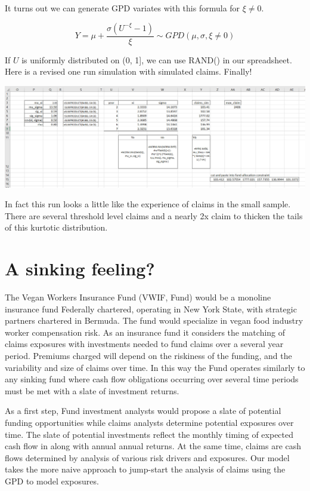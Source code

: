 \documentclass[
]{book}
\begin{document}
It turns out we can generate GPD variates with this formula for \(\xi \neq 0\).

\[
Y =\mu + \frac {\sigma (U^{-\xi }-1)}{\xi } \sim GPD(\mu ,\sigma ,\xi \neq 0)
\]

If \(U\) is uniformly distributed on (0, 1{]}, we can use RAND() in our spreadsheet. Here is a revised one run simulation with simulated claims. Finally!

\includegraphics{images/06/claims-xi-sigm-sim-2.jpg}

In fact this run looks a little like the experience of claims in the small sample. There are several threshold level claims and a nearly 2x claim to thicken the tails of this kurtotic distribution.

\hypertarget{a-sinking-feeling}{%
\section{A sinking feeling?}\label{a-sinking-feeling}}

The Vegan Workers Insurance Fund (VWIF, Fund) would be a monoline insurance fund Federally chartered, operating in New York State, with strategic partners chartered in Bermuda. The fund would specialize in vegan food industry worker compensation risk. As an insurance fund it considers the matching of claims exposures with investments needed to fund claims over a several year period. Premiums charged will depend on the riskiness of the funding, and the variability and size of claims over time. In this way the Fund operates similarly to any sinking fund where cash flow obligations occurring over several time periods must be met with a slate of investment returns.

As a first step, Fund investment analysts would propose a slate of potential funding opportunities while claims analysts determine potential exposures over time. The slate of potential investments reflect the monthly timing of expected cash flow in along with annual annual returns. At the same time, claims are cash flows determined by analysis of various risk drivers and exposures. Our model takes the more naive approach to jump-start the analysis of claims using the GPD to model exposures.
\end{document}
